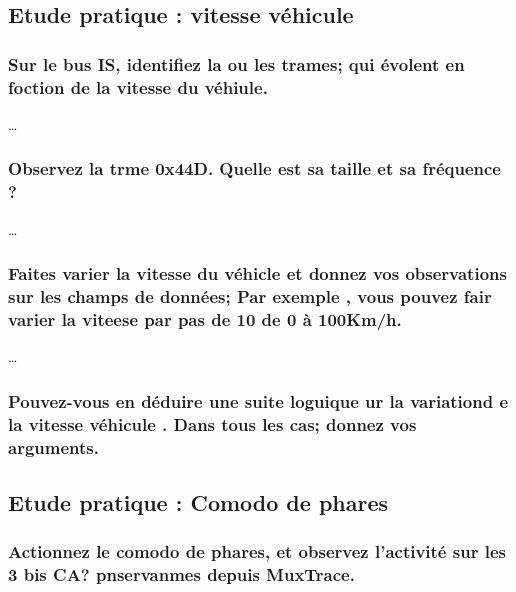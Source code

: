 \documentclass{rapportECC}
\begin{document}

\subsection{Etude pratique : vitesse véhicule}

\subsubsection*{Sur le bus IS, identifiez la ou les trames; qui évolent en foction de la vitesse du véhiule.}

\dots

\subsubsection*{Observez la trme 0x44D. Quelle est sa taille et sa fréquence ?}

\dots

\subsubsection*{Faites varier la vitesse du véhicle et donnez vos observations sur les champs de données; Par exemple , vous pouvez fair varier la viteese par pas de 10 de 0 à 100Km/h.}

\dots

\subsubsection*{Pouvez-vous en déduire une suite loguique ur la variationd e la vitesse véhicule . Dans tous les cas; donnez vos arguments.}

\subsection{Etude pratique : Comodo de phares}

\subsubsection*{Actionnez le comodo de phares, et observez l'activité sur les 3 bis CA? pnservanmes depuis MuxTrace.}
\end{document}
